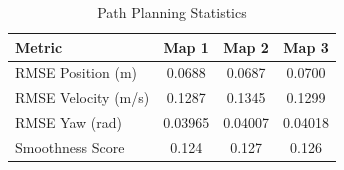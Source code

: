 \documentclass[11pt]{article}
\begin{document}
\begin{table}[htbp]
\centering
\caption{Path Planning Statistics}
\label{tab:stats}
\begin{tabular}{lccc}
\toprule
\textbf{Metric} & \textbf{Map 1} & \textbf{Map 2} & \textbf{Map 3} \\
\midrule
RMSE Position (m) & 0.0688 & 0.0687 & 0.0700 \\
RMSE Velocity (m/s) & 0.1287 & 0.1345 & 0.1299 \\
RMSE Yaw (rad) & 0.03965 & 0.04007 & 0.04018 \\
Smoothness Score & 0.124 & 0.127 & 0.126 \\
\bottomrule
\end{tabular}
\end{table}
\end{document}
